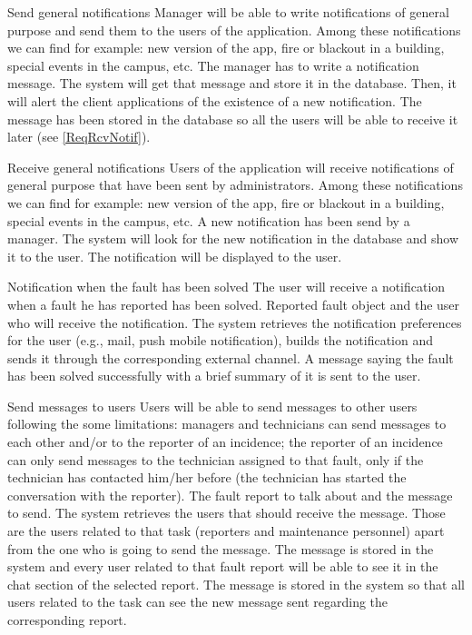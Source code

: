 \begin{requirement}{Send general notifications}
\reqdesc Manager will be able to write notifications of general purpose and send them to the users of the application. Among these notifications we can find for example: new version of the app, fire or blackout in a building, special events in the campus, etc.
\reqin The manager has to write a notification message.
\reqsteps The system will get that message and store it in the database. Then, it will alert the client applications of the existence of a new notification.
\reqout The message has been stored in the database so all the users will be able to receive it later (see \ref{ReqRcvNotif}).
\end{requirement}



\begin{requirement}{Receive general notifications}\label{ReqRcvNotif}
\reqdesc Users of the application will receive notifications of general purpose that have been sent by administrators. Among these notifications we can find for example: new version of the app, fire or blackout in a building, special events in the campus, etc.
\reqin A new notification has been send by a manager.
\reqsteps The system will look for the new notification in the database and show it to the user.
\reqout The notification will be displayed to the user.
\end{requirement}

\begin{requirement}{Notification when the fault has been solved}
\reqdesc The user will receive a notification when a fault he has reported has been solved.
\reqin Reported fault object and the user who will receive the notification.
\reqsteps The system retrieves the notification preferences for the user (e.g., mail, push mobile notification), builds the notification and sends it through the corresponding external channel.
\reqout A message saying the fault has been solved successfully with a brief summary of it is sent to the user.
\end{requirement}



\begin{requirement}{Send messages to users}
\reqdesc Users will be able to send messages to other users following the some limitations: managers and technicians can send messages to each other and/or to the reporter of an incidence; the reporter of an incidence can only send messages to the technician assigned to that fault, only if the technician has contacted him/her before (the technician has started the conversation with the reporter).
\reqin The fault report to talk about and the message to send.
\reqsteps The system retrieves the users that should receive the message. Those are the users related to that task (reporters and maintenance personnel) apart from the one who is going to send the message. The message is stored in the system and every user related to that fault report will be able to see it in the chat section of the selected report.
\reqout The message is stored in the system so that all users related to the task can see the new message sent regarding the corresponding report.
\end{requirement}

